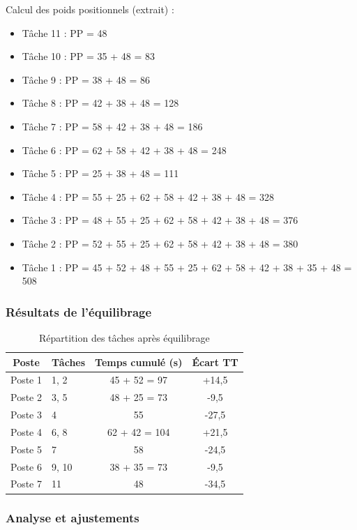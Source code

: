 \documentclass[12pt,a4paper]{article}
\begin{document}
\begin{center}
Calcul des poids positionnels (extrait) :

\begin{itemize}
    \item Tâche 11 : PP = 48
    \item Tâche 10 : PP = 35 + 48 = 83
    \item Tâche 9 : PP = 38 + 48 = 86
    \item Tâche 8 : PP = 42 + 38 + 48 = 128
    \item Tâche 7 : PP = 58 + 42 + 38 + 48 = 186
    \item Tâche 6 : PP = 62 + 58 + 42 + 38 + 48 = 248
    \item Tâche 5 : PP = 25 + 38 + 48 = 111
    \item Tâche 4 : PP = 55 + 25 + 62 + 58 + 42 + 38 + 48 = 328
    \item Tâche 3 : PP = 48 + 55 + 25 + 62 + 58 + 42 + 38 + 48 = 376
    \item Tâche 2 : PP = 52 + 55 + 25 + 62 + 58 + 42 + 38 + 48 = 380
    \item Tâche 1 : PP = 45 + 52 + 48 + 55 + 25 + 62 + 58 + 42 + 38 + 35 + 48 = 508
\end{itemize}

\subsubsection{Résultats de l'équilibrage}

\begin{table}[H]
\centering
\caption{Répartition des tâches après équilibrage}
\label{tab:auto_repartition}
\begin{tabular}{|c|l|c|c|}
\hline
\textbf{Poste} & \textbf{Tâches} & \textbf{Temps cumulé (s)} & \textbf{Écart TT} \\ \hline
Poste 1 & 1, 2 & 45 + 52 = 97 & +14,5 \\
Poste 2 & 3, 5 & 48 + 25 = 73 & -9,5 \\
Poste 3 & 4 & 55 & -27,5 \\
Poste 4 & 6, 8 & 62 + 42 = 104 & +21,5 \\
Poste 5 & 7 & 58 & -24,5 \\
Poste 6 & 9, 10 & 38 + 35 = 73 & -9,5 \\
Poste 7 & 11 & 48 & -34,5 \\
\hline
\end{tabular}
\end{table}

\subsubsection{Analyse et ajustements}


\end{center}
\end{document}
